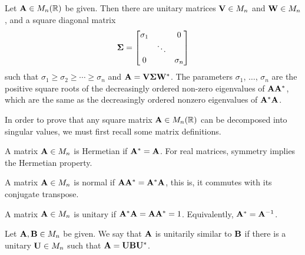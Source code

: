 \begin{thm}
  Let $\mathbf{A} \in M_{n}(\mathbb{R})$ be given. Then there are unitary matrices $\mathbf{V} \in M_n$ and $\mathbf{W} \in M_n$, and a square diagonal
  matrix
  \[
    \mathbf{\Sigma} =
      \begin{bmatrix}
        \sigma_1 &        & 0        \\
                 & \ddots &          \\
        0        &        & \sigma_n \\
      \end{bmatrix}
  \]
  such that $\sigma_1 \geq \sigma_2 \geq \cdots \geq \sigma_n$ and $\mathbf{A} = \mathbf{V}\mathbf{\Sigma}\mathbf{W}^*$.  The parameters $\sigma_1$,
  $\hdots$, $\sigma_n$ are the positive square roots of the decreasingly ordered non-zero eigenvalues of $\mathbf{A}\mathbf{A}^*$, which are the
  same as the decreasingly ordered nonzero eigenvalues of $\mathbf{A}^*\mathbf{A}$.

\end{thm}

In order to prove that any square matrix $\mathbf{A} \in M_n(\mathbb{R})$ can be decomposed into singular values, we must first recall some
matrix definitions.

\begin{defn}
  A matrix $\mathbf{A} \in M_n$ is \textnormal{Hermetian} if $\mathbf{A}^* =  \mathbf{A}$.  For real matrices, symmetry implies the Hermetian property.
\end{defn}

\begin{defn}
  A matrix $\mathbf{A} \in M_n$ is \textnormal{normal} if $\mathbf{A}\mathbf{A}^* = \mathbf{A}^*\mathbf{A}$, this is, it commutes with its conjugate transpose.
\end{defn}

\begin{defn}
  A matrix $\mathbf{A} \in M_n$ is \textnormal{unitary} if $\mathbf{A}^*\mathbf{A} = \mathbf{A}\mathbf{A}^* = 1$.  Equivalently, $\mathbf{A}^* = \mathbf{A}^{-1}$.
\end{defn}

\begin{defn}
  Let $\mathbf{A},\mathbf{B} \in M_n$ be given.  We say that $\mathbf{A}$ is \textnormal{unitarily similar} to $\mathbf{B}$ if there is a unitary
  $\mathbf{U} \in M_n$ such that $\mathbf{A} = \mathbf{U}\mathbf{B}\mathbf{U}^*$.
\end{defn}

